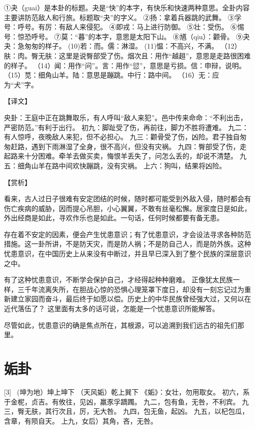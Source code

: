 \documentclass[12pt,UTF8]{ctexbook}
\begin{document}
①夬（guai）是本卦的标题。夬是“快”的本字，有快乐和快速两种意思。全卦内容主要讲防范敌人和行旅。标题取“夬”的字义。
②扬：拿着兵器跳的武舞。
③孚号：呼号。有厉：有敌人来侵犯。
④即戎：马上进行防御。
⑤壮：受伤。
⑥惕号：惊恐呼号。
⑦莫：“暮”的本字，意思是太阳下山。
⑧馗（qiu）：颧骨。
⑨夬夬：急匆匆的样子。
(10)若：而。儒：淋湿。
(11)愠：不高兴，不满。
（12）肤：肉。臀无肤：这里是说臀部受了伤。烟次且：用作“越趄”，意思是走路很困难的样子。
（14）闻：用作“问”。言：用作“愆”，意思是亏损。信：申辩，说明。
（15）苋：细角山羊。陆：意思是蹦跳。中行：路中间。
（16）无：应为“犬”字。

【译文】

央卦：王庭中正在跳舞取乐，有人呼叫“敌人来犯”。邑中传来命命：“不利出击，严密防范。”有利于出行。
初九：脚趾受了伤，再前往，脚力不胜将遭难。
九二：有人惊呼，夜晚敌人来犯，但不必担心。
九三：颧骨受了伤，凶险。君子独自匆匆赶路，遇到下雨淋湿了全身，很不高兴，但没有灾祸。
九四：臀部受了伤，走起路来十分困难。牵羊去做买卖，悔恨羊丢失了，问怎么丢的，却说不清楚。
九五：细角山羊在路中间欢快蹦跳，没有灾祸。
上六：狗叫，结果将凶险。

【赏析】

看来，古人过日子很难有安定团结的时候，随时都可能受到外敌入侵，随时都会有伤亡疾病的威胁，因而提心吊胆，小心翼翼，不敢有丝毫松懈。居家度日是如此，外出经商是如此，寻欢作乐也是如此。一句话，任何时候都要有备无患。

存在着不安定的因素，便会产生忧患意识；有了忧患意识，才会设法寻求各种防范措施。这一卦所讲，不是防天灾，而是防人祸；不是防自己人，而是防外族。这种忧患意识，在中国历史上从来没有中断过，并且早已深入到了整个民族的深层意识之中。

有了这种忧患意识，不断学会保护自己，才经得起种种磨难。 正像犹太民族一样，三千年流离失所，在胆战心惊的恐惧心理笼罩下度日，却没有一刻忘记过为重新建立家园而奋斗，最后终于如愿以偿。历史上的中华民族曾经强大过，又何以在近代落伍了？ 这里面有太多的话可说，怎能是一个忧患意识所能解答。

尽管如此，忧患意识的确是焦点所在，其根源，可以追溯到我们远古的祖先们那里。

\chapter{姤卦}
[3] \ (坤为地）坤上坤下
（天风姤）乾上巽下
《姤》：女壮，勿用取女。
初六，系于金柅，贞吉。有攸往，见凶，羸豕孚蹢躅。
九二，包有鱼，无咎，不利宾。
九三，臀无肤，其行次且，厉，无大咎。
九四，包无鱼，起凶。
九五，以杞包瓜，含章，有陨自天。
上九，女后）其角，吝，无咎。
\end{document}
